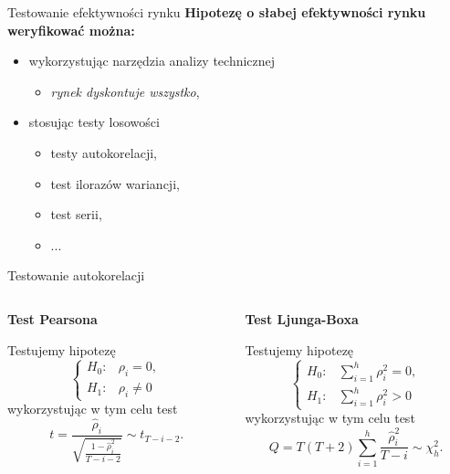 \documentclass[a4paper, 11pt]{beamer}
\begin{document}
	\begin{frame}{Testowanie efektywności rynku}
		\textbf{Hipotezę o słabej efektywności rynku weryfikować można:}
		\begin{itemize}
			\item wykorzystując narzędzia analizy technicznej
			\begin{itemize}
				\item \textit{rynek dyskontuje wszystko},
			\end{itemize}
			\item stosując testy losowości
			\begin{itemize}
				\item testy autokorelacji,
				\item test ilorazów wariancji,
				\item test serii,
				\item ...
			\end{itemize}
		\end{itemize}
	\end{frame}
	
	\begin{frame}{Testowanie autokorelacji}
		\begin{columns}
			\begin{column}{0.5\textwidth}
				\begin{center}
					\textbf{Test Pearsona}
				\end{center}
				Testujemy hipotezę \[
					\begin{cases}
						H_{0}: & \rho_{i}=0,\\
						H_{1}: & \rho_{i}\neq0
					\end{cases}
				\]
				wykorzystując w tym celu test \[
					t=\frac{\hat{\rho}_i}{\sqrt{\frac{1-\hat{\rho}^2_i}{T-i-2}}} \sim t_{T-i-2}.
				\]
			\end{column}
			\begin{column}{0.5\textwidth}
				\begin{center}
					\textbf{Test Ljunga-Boxa}
				\end{center}
				Testujemy hipotezę \[
					\begin{cases}
						H_{0}: & \sum_{i=1}^{h} \rho_{i}^{2}=0,\\
						H_{1}: & \sum_{i=1}^{h} \rho_{i}^{2}>0
					\end{cases}
				\]
				wykorzystując w tym celu test \[
					Q = T \left(T + 2\right) \sum_{i=1}^h \frac{\hat{\rho}^2_i}{T-i} \sim \chi^2_{h}.
				\]
			\end{column}
		\end{columns}
	\end{frame}
	
\end{document}
